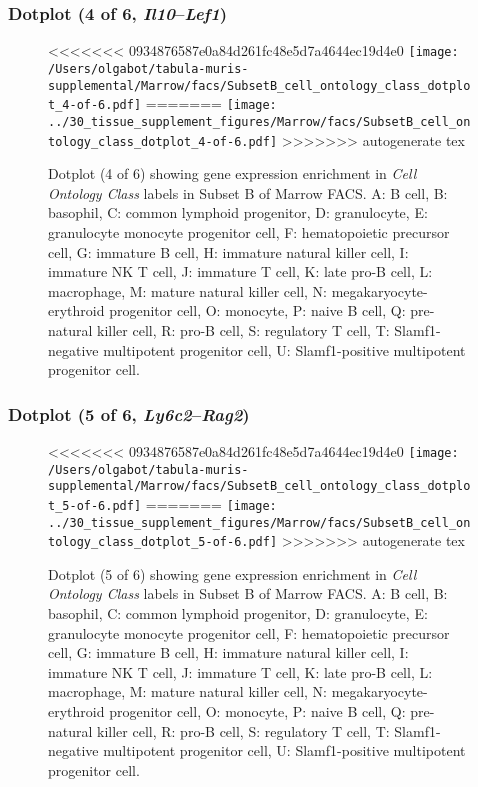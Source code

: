 \clearpage

\subsubsection{Dotplot (4 of 6, \emph{Il10}--\emph{Lef1})}
\begin{figure}[h]
\centering
<<<<<<< 0934876587e0a84d261fc48e5d7a4644ec19d4e0
\texttt{[image: /Users/olgabot/tabula-muris-supplemental/Marrow/facs/SubsetB\_cell\_ontology\_class\_dotplot\_4-of-6.pdf]}
=======
\texttt{[image: ../30\_tissue\_supplement\_figures/Marrow/facs/SubsetB\_cell\_ontology\_class\_dotplot\_4-of-6.pdf]}
>>>>>>> autogenerate tex

\caption{ Dotplot (4 of 6)  showing gene expression enrichment in \emph{Cell Ontology Class} labels in Subset B of Marrow FACS. A: B cell, B: basophil, C: common lymphoid progenitor, D: granulocyte, E: granulocyte monocyte progenitor cell, F: hematopoietic precursor cell, G: immature B cell, H: immature natural killer cell, I: immature NK T cell, J: immature T cell, K: late pro-B cell, L: macrophage, M: mature natural killer cell, N: megakaryocyte-erythroid progenitor cell, O: monocyte, P: naive B cell, Q: pre-natural killer cell, R: pro-B cell, S: regulatory T cell, T: Slamf1-negative multipotent progenitor cell, U: Slamf1-positive multipotent progenitor cell.}
\end{figure}


\clearpage

\subsubsection{Dotplot (5 of 6, \emph{Ly6c2}--\emph{Rag2})}
\begin{figure}[h]
\centering
<<<<<<< 0934876587e0a84d261fc48e5d7a4644ec19d4e0
\texttt{[image: /Users/olgabot/tabula-muris-supplemental/Marrow/facs/SubsetB\_cell\_ontology\_class\_dotplot\_5-of-6.pdf]}
=======
\texttt{[image: ../30\_tissue\_supplement\_figures/Marrow/facs/SubsetB\_cell\_ontology\_class\_dotplot\_5-of-6.pdf]}
>>>>>>> autogenerate tex

\caption{ Dotplot (5 of 6)  showing gene expression enrichment in \emph{Cell Ontology Class} labels in Subset B of Marrow FACS. A: B cell, B: basophil, C: common lymphoid progenitor, D: granulocyte, E: granulocyte monocyte progenitor cell, F: hematopoietic precursor cell, G: immature B cell, H: immature natural killer cell, I: immature NK T cell, J: immature T cell, K: late pro-B cell, L: macrophage, M: mature natural killer cell, N: megakaryocyte-erythroid progenitor cell, O: monocyte, P: naive B cell, Q: pre-natural killer cell, R: pro-B cell, S: regulatory T cell, T: Slamf1-negative multipotent progenitor cell, U: Slamf1-positive multipotent progenitor cell.}
\end{figure}


